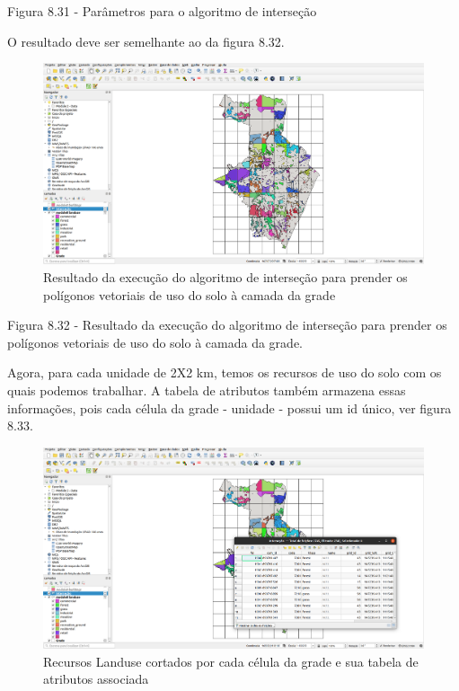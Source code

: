 \documentclass[
  portuguese,
]{krantz}
\begin{document}
Figura 8.31 - Parâmetros para o algoritmo de interseção

O resultado deve ser semelhante ao da figura 8.32.

\begin{figure}
\centering
\includegraphics{media/modulo8/fig832.png}
\caption{Resultado da execução do algoritmo de interseção para prender os polígonos vetoriais de uso do solo à camada da grade}
\end{figure}

Figura 8.32 - Resultado da execução do algoritmo de interseção para prender os polígonos vetoriais de uso do solo à camada da grade.

Agora, para cada unidade de 2X2 km, temos os recursos de uso do solo com os quais podemos trabalhar. A tabela de atributos também armazena essas informações, pois cada célula da grade - unidade - possui um id único, ver figura 8.33.

\begin{figure}
\centering
\includegraphics{media/modulo8/fig833.png}
\caption{Recursos Landuse cortados por cada célula da grade e sua tabela de atributos associada}
\end{figure}
\end{document}
